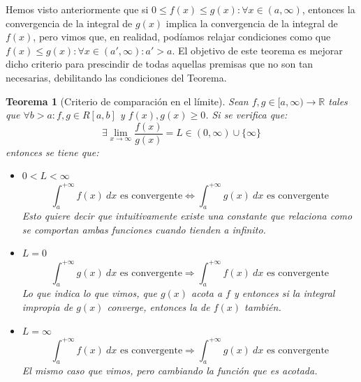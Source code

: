 \documentclass[10pt,a4paper,openright]{book}
\theoremstyle{break}
\newtheorem{theo}{Teorema}[chapter]
\newcommand{\dif}[1]{\ d#1}
\begin{document}
Hemos visto anteriormente que si $0\leq f(x)\leq g(x):\forall x \in (a,\infty)$, entonces la convergencia de la integral de $g(x)$ implica la convergencia de la integral de $f(x)$, pero vimos que, en realidad, podíamos relajar condiciones como que $f(x)\leq g(x): \forall x\in (a',\infty) : a' > a$. El objetivo de este teorema es mejorar dicho criterio para prescindir de todas aquellas premisas que no son tan necesarias, debilitando las condiciones del Teorema.

\begin{theo}[Criterio de comparación en el límite]
Sean $f,g\in [a,\infty)\rightarrow \mathbb R$ tales que $\forall b > a: f,g\in R[a,b]$ y $f(x),g(x)\geq 0$. Si se verifica que:
$$\exists \lim_{x \rightarrow \infty} \frac{f(x)}{g(x)} = L \in (0, \infty)\cup \{\infty\}$$
entonces se tiene que:
\begin{itemize}
\item $0< L < \infty$
$$\int_{a}^{+\infty} f(x) \dif{x} \mbox{ es convergente}\Leftrightarrow \int_{a}^{+\infty} g(x) \dif{x} \mbox{ es convergente}$$
Esto quiere decir que intuitivamente existe una constante que relaciona como se comportan ambas funciones cuando tienden a infinito.
\item $L=0$
$$\int_{a}^{+\infty} g(x)\dif{x}\mbox{ es convergente}\Rightarrow \int_{a}^{+\infty} f(x)\dif{x}\mbox{ es convergente}$$
Lo que indica lo que vimos, que $g(x)$ acota a $f$ y entonces si la integral impropia de $g(x)$ converge, entonces la de $f(x)$ también.
\item $L=\infty$
$$\int_{a}^{+\infty} f(x)\dif{x}\mbox{ es convergente}\Rightarrow \int_{a}^{+\infty} g(x)\dif{x}\mbox{ es convergente}$$
El mismo caso que vimos, pero cambiando la función que es acotada.
\end{itemize}
\end{theo}
\end{document}
